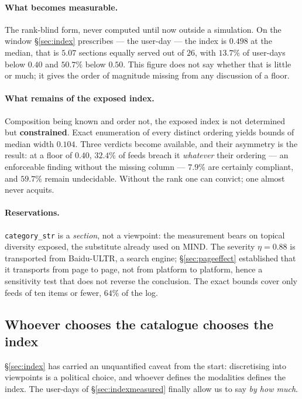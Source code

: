 \documentclass[11pt,a4paper]{article}
\begin{document}
\paragraph{What becomes measurable.} The rank-blind form, never computed until now outside a
simulation. On the window \S\ref{sec:index} prescribes --- the user-day --- the index is $0.498$
at the median, that is $5.07$ sections equally served out of $26$, with $13.7\%$ of user-days
below $0.40$ and $50.7\%$ below $0.50$. This figure does not say whether that is little or much;
it gives the order of magnitude missing from any discussion of a floor.

\paragraph{What remains of the exposed index.} Composition being known and order not, the
exposed index is not determined but \textbf{constrained}. Exact enumeration of every distinct
ordering yields bounds of median width $0.104$. Three verdicts become available, and their
asymmetry is the result: at a floor of $0.40$, $32.4\%$ of feeds breach it \emph{whatever} their
ordering --- an enforceable finding without the missing column --- $7.9\%$ are certainly
compliant, and $59.7\%$ remain undecidable. Without the rank one can convict; one almost never
acquits.

\paragraph{Reservations.} \texttt{category\_str} is a \emph{section}, not a viewpoint: the
measurement bears on topical diversity exposed, the substitute already used on MIND. The severity
$\eta = 0.88$ is transported from Baidu-ULTR, a search engine; \S\ref{sec:pageeffect}
established that it transports from page to page, not from platform to platform, hence a
sensitivity test that does not reverse the conclusion. The exact bounds cover only feeds of ten
items or fewer, $64\%$ of the log.

\subsection{Whoever chooses the catalogue chooses the index}
\label{sec:catalogue}

\S\ref{sec:index} has carried an unquantified caveat from the start: discretising into viewpoints
is a political choice, and whoever defines the modalities defines the index. The user-days of
\S\ref{sec:indexmeasured} finally allow us to say \emph{by how much}.
\end{document}
